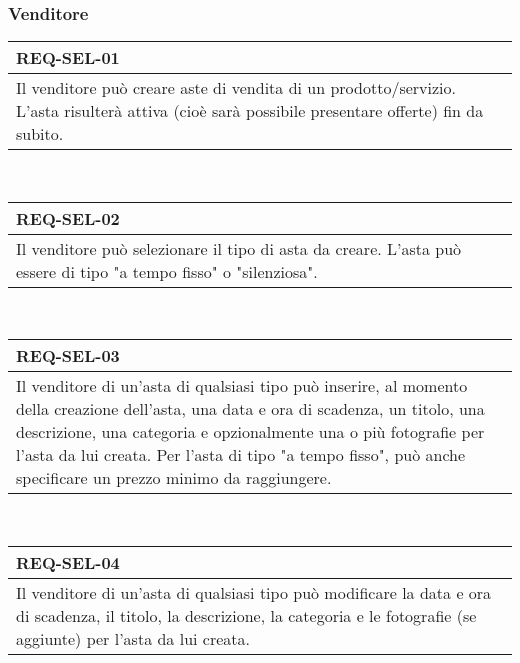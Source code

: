             \subsubsection{Venditore}
                \begin{tabular}{|p{}|}
                    \hline
                    \multicolumn{1}{|l|}{\cellcolor{head}\textbf{REQ-SEL-01}} \\
                    \hline
                    Il venditore può creare aste di vendita di un prodotto/servizio. L'asta risulterà attiva (cioè sarà possibile presentare offerte) fin da subito. \\
                    \hline
                \end{tabular} \smallskip \\
                \begin{tabular}{|p{}|}
                    \hline
                    \multicolumn{1}{|l|}{\cellcolor{head}\textbf{REQ-SEL-02}} \\
                    \hline
                    Il venditore può selezionare il tipo di asta da creare. L'asta può essere di tipo "a tempo fisso" o "silenziosa". \\
                    \hline
                \end{tabular} \smallskip \\
                \begin{tabular}{|p{}|}
                    \hline
                    \multicolumn{1}{|l|}{\cellcolor{head}\textbf{REQ-SEL-03}} \\
                    \hline
                    Il venditore di un'asta di qualsiasi tipo può inserire, al momento della creazione dell'asta, una data e ora di scadenza, un titolo, una descrizione, una categoria e opzionalmente una o più fotografie per l'asta da lui creata. Per l'asta di tipo "a tempo fisso", può anche specificare un prezzo minimo da raggiungere. \\
                    \hline
                \end{tabular} \smallskip \\
                \begin{tabular}{|p{}|}
                    \hline
                    \multicolumn{1}{|l|}{\cellcolor{head}\textbf{REQ-SEL-04}} \\
                    \hline
                    Il venditore di un'asta di qualsiasi tipo può modificare la data e ora di scadenza, il titolo, la descrizione, la categoria e le fotografie (se aggiunte) per l'asta da lui creata. \\
                    \hline
                \end{tabular} \smallskip \\
